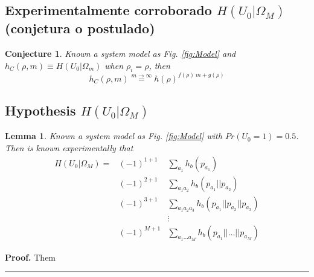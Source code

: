 \documentclass[a4paper,10pt]{article}
\newtheorem{mylemma}[mytheorem]{Lemma}
\newtheorem{conjecture}[mytheorem]{Conjecture}
\newenvironment{myproof}[1][Proof]{\textbf{#1.} }{\ \rule{0.5em}{0.5em}}
\begin{document}
\subsection{Experimentalmente corroborado $H(U_0|\Omega_M)$ (conjetura o postulado)}
\label{subsec:h0OmegaM_2}


\begin{mdframed}[style=MDFStyGrayScreen]
\begin{conjecture}
 \label{lemm:h0OmegaM_2}
 Known a system model as Fig. \ref{fig:Model} and $h_{C}(\rho,m)\equiv H(U_0|\Omega_m)$ when $\rho_i=\rho$, then
\begin{equation}\label{eq:Hconjecture1}
h_{C}(\rho,m)  \stackrel{m \rightarrow \infty }{=} h(\rho)^{f(\rho)~m+g(\rho)}
\end{equation}
\end{conjecture}
\end{mdframed}


\subsection{Hypothesis $H(U_0|\Omega_M)$}
\label{subsec:h0OmegaM}

\begin{mylemma}
 \label{lemm:1}
  Known a system model as Fig. \ref{fig:Model} with $Pr(U_0=1)=0.5$. Then is known 
experimentally that
\begin{equation}
 \begin{matrix}
 H(U_0|\Omega_M)= & (-1)^{1+1} & \sum \limits_{a_1}         h_b(p_{a_1}) \\
 ~                & (-1)^{2+1} & \sum \limits_{a_1 a_2}     h_b(p_{a_1}||p_{a_2}) \\ 
 ~                & (-1)^{3+1}  & \sum \limits_{a_1 a_2 a_3} h_b(p_{a_1}||p_{a_2}||p_{a_3}) \\ 
 ~                & ~ & \vdots \\
 ~                & (-1)^{M+1}  & \sum \limits_{a_1 ... a_M} h_b(p_{a_1}|| ... ||p_{a_M}) 
 \end{matrix}
\end{equation}

\end{mylemma}
\begin{myproof}
Them
\end{myproof}
\end{document}
